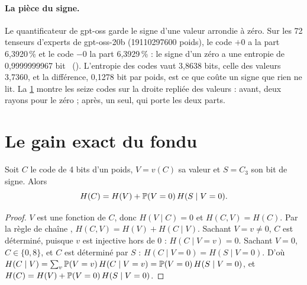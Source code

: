\paragraph{La pièce du signe.} Le quantificateur de gpt-oss garde le signe d'une valeur arrondie à zéro. Sur les 72 tenseurs d'experts de gpt-oss-20b (\num{19110297600} poids), le code $+0$ a la part 6,3920\,\% et le code $-0$ la part 6,3929\,\% : le signe d'un zéro a une entropie de 0,9999999967 bit \mes~(). L'entropie des codes vaut 3,8638 bits, celle des valeurs 3,7360, et la différence, 0,1278 bit par poids, est ce que coûte un signe que rien ne lit. La \cref{fig:t3-codon-roue} montre les seize codes sur la droite repliée des valeurs : avant, deux rayons pour le zéro ; après, un seul, qui porte les deux parts.

\begin{figure}[tbp]
\centering
\GrapheCodonRoue
{}
\label{fig:t3-codon-roue}
\end{figure}

\section{Le gain exact du fondu}\label{t3cod:sec:gain}

\begin{proposition}\label{t3cod:prop:gain}
Soit $C$ le code de 4 bits d'un poids, $V = v(C)$ sa valeur et $S = C_3$ son bit de signe. Alors
\begin{equation}\label{t3cod:eq:gain}
H(C) = H(V) + \mathbb{P}(V = 0)\, H(S \mid V = 0).
\end{equation}
\end{proposition}

\begin{proof}
$V$ est une fonction de $C$, donc $H(V \mid C) = 0$ et $H(C, V) = H(C)$. Par la règle de chaîne \parencite{cover2006}, $H(C, V) = H(V) + H(C \mid V)$. Sachant $V = v \ne 0$, $C$ est déterminé, puisque $v$ est injective hors de 0 : $H(C \mid V = v) = 0$. Sachant $V = 0$, $C \in \{0, 8\}$, et $C$ est déterminé par $S$ : $H(C \mid V = 0) = H(S \mid V = 0)$. D'où $H(C \mid V) = \sum_v \mathbb{P}(V = v)\, H(C \mid V = v) = \mathbb{P}(V = 0)\, H(S \mid V = 0)$, et $H(C) = H(V) + \mathbb{P}(V = 0)\,H(S \mid V = 0)$.
\end{proof}

